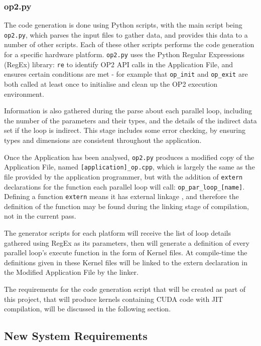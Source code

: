 \subsubsection{op2.py}
\label{ss:impl_op2}
The code generation is done using Python scripts, with the main script being \verb|op2.py|, which parses the input files to gather data, and provides this data to a number of other scripts. Each of these other scripts performs the code generation for a specific hardware platform. \verb|op2.py| uses the Python Regular Expressions (RegEx) library: \verb|re| \cite{re} to identify OP2 API calls in the Application File, and ensures certain conditions are met - for example that \verb|op_init| and \verb|op_exit| are both called at least once to initialise and clean up the OP2 execution environment.
\par
Information is also gathered during the parse about each parallel loop, including the number of the parameters and their types, and the details of the indirect data set if the loop is indirect. This stage includes some error checking, by ensuring types and dimensions are consistent throughout the application.
\par
Once the Application has been analysed, \verb|op2.py| produces a modified copy of the Application File, named \verb|[application]_op.cpp|, which is largely the same as the file provided by the application programmer, but with the addition of \verb|extern| declarations for the function each parallel loop will call: \verb|op_par_loop_[name]|. Defining a function \verb|extern| means it has external linkage \cite{linkage}, and therefore the definition of the function may be found during the linking stage of compilation, not in the current pass.
\par
The generator scripts for each platform will receive the list of loop details gathered using RegEx as its parameters, then will generate a definition of every parallel loop's execute function in the form of Kernel files. At compile-time the definitions given in these Kernel files will be linked to the extern declaration in the Modified Application File by the linker.
\par
The requirements for the code generation script that will be created as part of this project, that will produce kernels containing CUDA code with JIT compilation, will be discussed in the following section.

\subsection{New System Requirements}
\label{ss:reqs}

